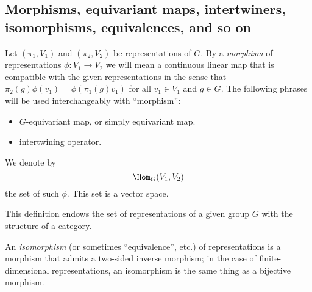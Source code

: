 \documentclass[reqno]{amsart} 
\begin{document}
\subsection{Morphisms, equivariant maps, intertwiners, isomorphisms, equivalences, and so on}\label{sec:cnh2vn9bow}

\begin{definition}
  Let $(\pi_1, V_1)$ and $(\pi_2, V_2)$ be representations of $G$.  By a \emph{morphism} of representations $\phi : V_1 \rightarrow V_2$ we will mean a continuous linear map that is compatible with the given representations in the sense that $\pi_2(g) \phi(v_1) = \phi(\pi_1(g) v_1)$ for all $v_1 \in V_1$ and $g \in G$.  The following phrases will be used interchangeably with ``morphism'':
  \begin{itemize}
  \item $G$-equivariant map, or simply equivariant map.
  \item intertwining operator.
  \end{itemize}
  We denote by
  \begin{equation*}
    \Hom_G(V_1,V_2)
  \end{equation*}
  the set of such $\phi$.  This set is a vector space.
  
  This definition endows the set of representations of a given group $G$ with the structure of a category.
  
  An \emph{isomorphism} (or sometimes ``equivalence'', etc.)  of representations is a morphism that admits a two-sided inverse morphism; in the case of finite-dimensional representations, an isomorphism is the same thing as a bijective morphism.
\end{definition}
\end{document}
